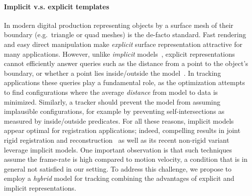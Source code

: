 

\paragraph{Implicit v.s. explicit templates}
In modern digital production representing objects by a surface mesh of their boundary (e.g.\ triangle or quad meshes) is the de-facto standard. Fast rendering and easy direct manipulation make \emph{explicit} surface representation attractive for many applications.
%
However, unlike \emph{implicit} models~\cite{bloomenthal1997book}, explicit representations cannot efficiently answer queries such as the distance from a point to the object's boundary, or whether a point lies inside/outside the model~\cite[Ch.1]{botsch2010book}. In tracking applications these queries play a fundamental role, as the optimization attempts to find configurations where the average \emph{distance} from model to data is minimized. Similarly, a tracker should prevent the model from assuming implausible configurations, for example by preventing self-intersections as measured by inside/outside predicates. For all these reasons, implicit models appear optimal for registration applications; indeed, compelling results in joint rigid registration and reconstruction~\cite{newcombe2011kinfu} as well as its recent non-rigid variant~\cite{newcombe2015dynfusion} leverage implicit models. One important observation is that such techniques assume the frame-rate is high compared to motion velocity, a condition that is in general not satisfied in our setting.  To address this challenge, we propose to employ a \emph{hybrid} model for tracking combining the advantages of explicit and implicit representations.


